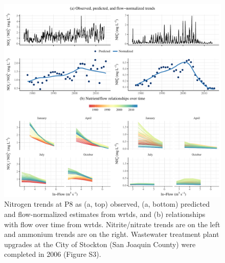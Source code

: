 \documentclass[letterpaper,12pt,oneside]{article}\usepackage[]{graphicx}\usepackage[]{color}
\begin{document}
\begin{figure}[!ht]

{\centering \includegraphics[width=\textwidth]{figs/p8trnds-1} 

}

\caption[Nitrogen trends at P8 as (a, top) observed, (a, bottom) predicted and flow-normalized estimates from \ac{wrtds}, and (b) relationships with flow over time from \ac{wrtds}]{Nitrogen trends at P8 as (a, top) observed, (a, bottom) predicted and flow-normalized estimates from \ac{wrtds}, and (b) relationships with flow over time from \ac{wrtds}.  Nitrite/nitrate trends are on the left and ammonium trends are on the right.  Wastewater treatment plant upgrades at the City of Stockton (San Joaquin County) were completed in 2006 (Figure S3).}\label{fig:p8trnds}
\end{figure}
\end{document}
